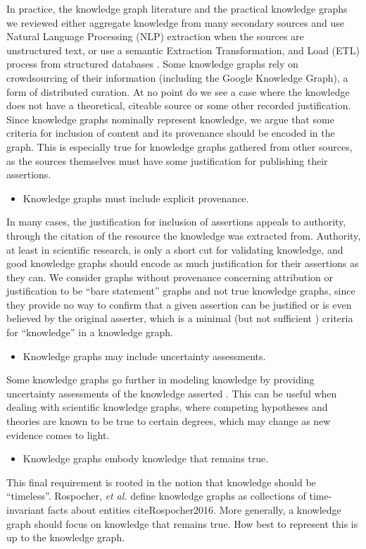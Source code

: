 In practice, the knowledge graph literature and the practical knowledge graphs we reviewed either aggregate knowledge from many secondary sources and use Natural Language Processing (NLP) extraction when the sources are unstructured text, or use a semantic Extraction Transformation, and Load (ETL) process from structured databases \cite{McCusker_2009}.
Some knowledge graphs rely on crowdsourcing of their information (including the Google Knowledge Graph), a form of distributed curation.
At no point do we see a case where the knowledge does not have a theoretical, citeable source or some other recorded justification.
Since knowledge graphs nominally represent knowledge, we argue that some criteria for inclusion of content and its provenance should be encoded in the graph.
This is especially true for knowledge graphs gathered from other sources, as the sources themselves must have some justification for publishing their assertions.
\begin {itemize}
\item Knowledge graphs must include explicit provenance.
\end {itemize}
In many cases, the justification for inclusion of assertions appeals to authority, through the citation of the resource the knowledge was extracted from.
Authority, at least in scientific research, is only a short cut for validating knowledge, and good knowledge graphs should encode as much justification for their assertions as they can.
We consider graphs without provenance concerning attribution or justification to be ``bare statement'' graphs and not true knowledge graphs, since they provide no way to confirm that a given assertion can be justified or is even believed by the original asserter, which is a minimal (but not sufficient \cite{Gettier_1963}) criteria for ``knowledge'' in a knowledge graph.

\begin {itemize}
\item Knowledge graphs may include uncertainty assessments.
\end {itemize}

Some knowledge graphs go further in modeling knowledge by providing uncertainty assessments of the knowledge asserted \cite{Dong_2014}.
This can be useful when dealing with scientific knowledge graphs, where competing hypotheses and theories are known to be true to certain degrees, which may change as new evidence comes to light.
\begin {itemize}
\item Knowledge graphs embody knowledge that remains true.
\end {itemize}

This final requirement is rooted in the notion that knowledge should be ``timeless''.
Rospocher, \textit{et al.} define knowledge graphs as collections of time-invariant facts about entities cite{Rospocher2016}.
More generally, a knowledge graph should focus on knowledge that remains true.
How best to represent this is up to the knowledge graph.